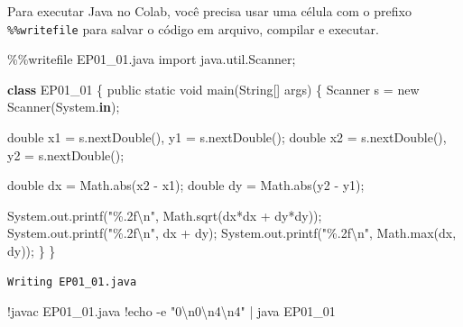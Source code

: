 \documentclass[
  portuguese,
  letterpaper,
  openany,
  oneside,
  12pt,
  a4paper]{book}
\newenvironment{Shaded}{\begin{snugshade}}{\end{snugshade}}
\newcommand{\BuiltInTok}[1]{\textcolor[rgb]{0.00,0.23,0.31}{#1}}
\newcommand{\CharTok}[1]{\textcolor[rgb]{0.13,0.47,0.30}{#1}}
\newcommand{\ImportTok}[1]{\textcolor[rgb]{0.00,0.46,0.62}{#1}}
\newcommand{\KeywordTok}[1]{\textcolor[rgb]{0.00,0.23,0.31}{\textbf{#1}}}
\newcommand{\NormalTok}[1]{\textcolor[rgb]{0.00,0.23,0.31}{#1}}
\newcommand{\OperatorTok}[1]{\textcolor[rgb]{0.37,0.37,0.37}{#1}}
\newcommand{\SpecialCharTok}[1]{\textcolor[rgb]{0.37,0.37,0.37}{#1}}
\newcommand{\StringTok}[1]{\textcolor[rgb]{0.13,0.47,0.30}{#1}}
\begin{document}
Para executar Java no Colab, você precisa usar uma célula com o prefixo
\texttt{\%\%writefile} para salvar o código em arquivo, compilar e
executar.

\begin{Shaded}
\begin{Highlighting}[]
\OperatorTok{\%\%}\NormalTok{writefile EP01\_01.java}
\ImportTok{import}\NormalTok{ java.util.Scanner}\OperatorTok{;}

\KeywordTok{class}\NormalTok{ EP01\_01 \{}
\NormalTok{    public static void main(String[] args) \{}
\NormalTok{        Scanner s }\OperatorTok{=}\NormalTok{ new Scanner(System.}\KeywordTok{in}\NormalTok{)}\OperatorTok{;}
        
\NormalTok{        double x1 }\OperatorTok{=}\NormalTok{ s.nextDouble(), y1 }\OperatorTok{=}\NormalTok{ s.nextDouble()}\OperatorTok{;}
\NormalTok{        double x2 }\OperatorTok{=}\NormalTok{ s.nextDouble(), y2 }\OperatorTok{=}\NormalTok{ s.nextDouble()}\OperatorTok{;}
        
\NormalTok{        double dx }\OperatorTok{=}\NormalTok{ Math.}\BuiltInTok{abs}\NormalTok{(x2 }\OperatorTok{{-}}\NormalTok{ x1)}\OperatorTok{;}
\NormalTok{        double dy }\OperatorTok{=}\NormalTok{ Math.}\BuiltInTok{abs}\NormalTok{(y2 }\OperatorTok{{-}}\NormalTok{ y1)}\OperatorTok{;}
        
\NormalTok{        System.out.printf(}\StringTok{"}\SpecialCharTok{\%.2f}\CharTok{\textbackslash{}n}\StringTok{"}\NormalTok{, Math.sqrt(dx}\OperatorTok{*}\NormalTok{dx }\OperatorTok{+}\NormalTok{ dy}\OperatorTok{*}\NormalTok{dy))}\OperatorTok{;}
\NormalTok{        System.out.printf(}\StringTok{"}\SpecialCharTok{\%.2f}\CharTok{\textbackslash{}n}\StringTok{"}\NormalTok{, dx }\OperatorTok{+}\NormalTok{ dy)}\OperatorTok{;}
\NormalTok{        System.out.printf(}\StringTok{"}\SpecialCharTok{\%.2f}\CharTok{\textbackslash{}n}\StringTok{"}\NormalTok{, Math.}\BuiltInTok{max}\NormalTok{(dx, dy))}\OperatorTok{;}
\NormalTok{    \}}
\NormalTok{\}}
\end{Highlighting}
\end{Shaded}

\begin{verbatim}
Writing EP01_01.java
\end{verbatim}

\begin{Shaded}
\begin{Highlighting}[]
\OperatorTok{!}\NormalTok{javac EP01\_01.java}
\OperatorTok{!}\NormalTok{echo }\OperatorTok{{-}}\NormalTok{e }\StringTok{"0}\CharTok{\textbackslash{}n}\StringTok{0}\CharTok{\textbackslash{}n}\StringTok{4}\CharTok{\textbackslash{}n}\StringTok{4"} \OperatorTok{|}\NormalTok{ java EP01\_01}
\end{Highlighting}
\end{Shaded}
\end{document}
